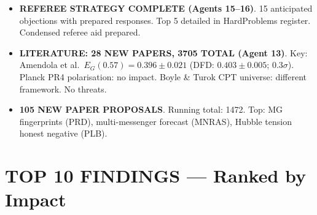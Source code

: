 \documentclass[11pt,a4paper]{article}
\begin{document}
\begin{itemize}
\item \textbf{REFEREE STRATEGY COMPLETE (Agents 15--16)}. 15 anticipated objections with prepared responses. Top 5 detailed in HardProblems register. Condensed referee aid prepared.

\item \textbf{LITERATURE: 28 NEW PAPERS, 3705 TOTAL (Agent 13)}. Key: Amendola et al.\ $E_G(0.57) = 0.396 \pm 0.021$ (DFD: $0.403 \pm 0.005$; $0.3\sigma$). Planck PR4 polarisation: no impact. Boyle \& Turok CPT universe: different framework. No threats.

\item \textbf{105 NEW PAPER PROPOSALS}. Running total: 1472. Top: MG fingerprints (PRD), multi-messenger forecast (MNRAS), Hubble tension honest negative (PLB).
\end{itemize}

\section{TOP 10 FINDINGS --- Ranked by Impact}
\label{sec:top10}
\end{document}
